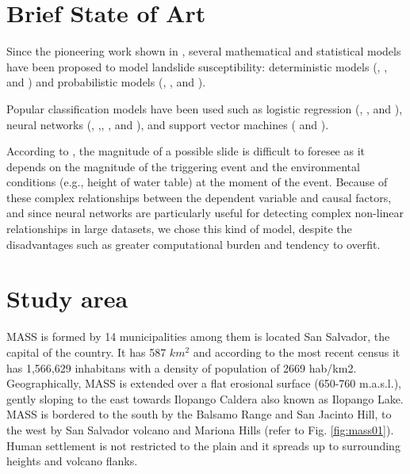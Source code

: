 \documentclass[11pt,twoside]{rmta2010eng}%
\begin{document}
\section{Brief State of Art}
\label{sec:brief}
Since the pioneering work shown in \cite{Carrara1983403}, several mathematical and statistical models have been proposed to model landslide susceptibility: deterministic models (\cite{hessd-10-12643-2013},  \cite{doi:10.1080/19475705.2010.498151}, and \cite{Neu2012511}) and probabilistic models (\cite{Bern198839}, \cite{Chung2003451}, and \cite{doi:10.1080/01431160310001618734}). 

Popular classification models have been used such as logistic regression (\cite{akgun2012}, \cite{gaskill}, and \cite{garcia2008}), neural networks (\cite{garcia2010}, \cite{Melchiorre2011410},\cite{Zeng2001374}, \cite{Ermini2005327}, and \cite{Yesilnacar2005251}), and support vector machines (\cite{ballabio2012support} and \cite{tien2012landslide}). 


According to \cite{van2006landslide}, the magnitude of a possible
slide is difficult to foresee as it depends on the magnitude of the triggering event and the environmental conditions (e.g., height of water table) at the moment of the event. Because of these complex relationships between the dependent variable and causal factors, and since neural networks are particularly useful for detecting complex non-linear relationships in large datasets, we chose this kind of model, despite the disadvantages such as greater computational burden and tendency to overfit.  



\section{Study area}
\label{sec:studyarea}
MASS is formed by 14 municipalities among them is located San Salvador, the capital of the country. It has 587 $km^{2}$ and according to the most recent census \cite{minecon} it has 1,566,629 inhabitans with a density of population of 2669 hab/km2. Geographically, MASS is extended over a flat erosional surface (650-760 m.a.s.l.), gently sloping to the east towards Ilopango Caldera also known as Ilopango Lake. MASS is bordered to the south by the Balsamo Range and San Jacinto Hill, to the west by San Salvador volcano and Mariona Hills (refer to Fig. \ref{fig:mass01}). Human settlement is not restricted to the plain and it spreads up to surrounding heights and volcano flanks.
\end{document}
